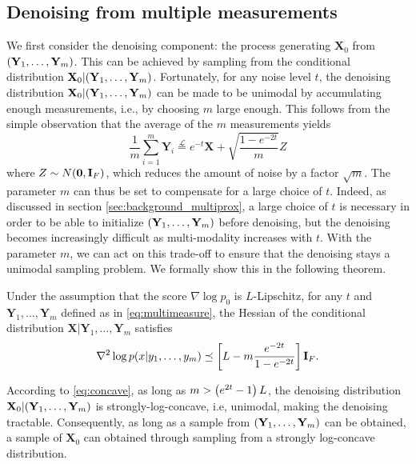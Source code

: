 \subsection{Denoising from multiple measurements}
We first consider the denoising component: the process generating $\mathbf{X}_0$ from $\mathopen{}\left(\mathbf{Y}_1, \dots, \mathbf{Y}_m\right)$. This can be achieved by sampling from the conditional distribution $\mathbf{X}_0|\mathopen{}\left(\mathbf{Y}_1, \dots, \mathbf{Y}_m\right)$. Fortunately, for any noise level $t$, the denoising distribution $\mathbf{X}_0|\mathopen{}\left(\mathbf{Y}_1, \dots, \mathbf{Y}_m\right)$ can be made to be unimodal by accumulating enough measurements, i.e., by choosing $m$ large enough. This follows from the simple observation that the average of the $m$ measurements yields
\begin{equation}
\frac{1}{m}\sum_{i=1}^m \mathbf{Y}_i \overset{\mathcal{L}}{=}  e^{-t} \mathbf{X} + \sqrt{\frac{1 - e^{-2t}}{m}}Z
\label{eq:noisereduction}
\end{equation}
where $Z \sim N\mathopen{}\left(\mathbf{0}, \mathbf{I}_F\right)$, which reduces the amount of noise by a factor $\sqrt{m}$. The parameter $m$ can thus be set to compensate for a large choice of $t$. Indeed, as discussed in section \ref{sec:background_multiprox}, a large choice of $t$ is necessary in order to be able to initialize $\mathopen{}\left(\mathbf{Y}_1, \dots, \mathbf{Y}_m\right)$ before denoising, but the denoising becomes increasingly difficult as multi-modality increases with $t$. With the parameter $m$, we can act on this trade-off to ensure that the denoising stays a unimodal sampling problem. We formally show this in the following theorem. 

\begin{theorem}
\label{thm:unimodality}
    Under the assumption that the score $\nabla \log p_0$ is $L$-Lipschitz, for any $t$ and $\mathbf{Y}_1, \dots, \mathbf{Y}_m$ defined as in \eqref{eq:multimeasure}, the Hessian of the conditional distribution $\mathbf{X}|\mathbf{Y}_1, \dots, \mathbf{Y}_m$ satisfies
    \begin{equation}
    \nabla ^2 \log p(x|y_1, \dots, y_m) \preceq \mathopen{}\left[L - m\frac{e^{-2t}}{1 - e^{-2t}}\right]\mathbf{I}_F.
    \label{eq:concave}
    \end{equation}
\end{theorem}

According to \eqref{eq:concave}, as long as $m > \mathopen{}\left(e^{2t} - 1\right) L$, the denoising distribution $\mathbf{X}_0|\mathopen{}\left(\mathbf{Y}_1, \dots, \mathbf{Y}_m\right)$ is strongly-log-concave, i.e, unimodal, making the denoising tractable. Consequently, as long as a sample from $\mathopen{}\left(\mathbf{Y}_1, \dots, \mathbf{Y}_m\right)$ can be obtained, a sample of $\mathbf{X}_0$ can obtained through sampling from a strongly log-concave distribution.

